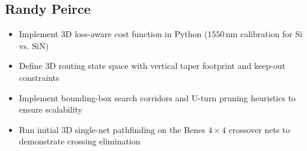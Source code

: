 \documentclass{article}
\begin{document}
\subsection{Randy Peirce}
    \begin{itemize}
        \item Implement 3D loss-aware cost function in Python ($1550\,\text{nm}$ calibration for Si vs. SiN)
        \item Define 3D routing state space with vertical taper footprint and keep-out constraints
        \item Implement bounding-box search corridors and U-turn pruning heuristics to ensure scalability
        \item Run initial 3D single-net pathfinding on the Benes $4\times4$ crossover nets to demonstrate crossing elimination
    \end{itemize}
\end{document}
